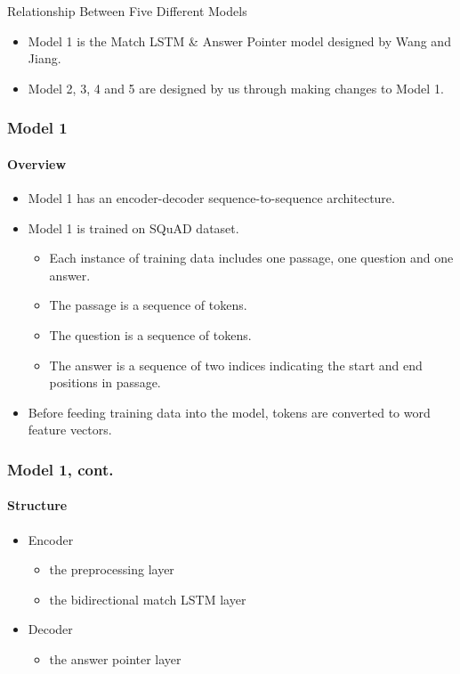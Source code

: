 \documentclass{beamer}
\begin{document}
\begin{frame}{Relationship Between Five Different Models}
    \begin{itemize}
        \item Model 1 is the Match LSTM \& Answer Pointer model designed by Wang and Jiang.
        \item Model 2, 3, 4 and 5 are designed by us through making changes to Model 1.
    \end{itemize}
\end{frame}

\begin{frame} \frametitle{Model 1}\framesubtitle{Overview}
  \begin{itemize}
      \item Model 1 has an encoder-decoder sequence-to-sequence architecture.
      \item Model 1 is trained on SQuAD dataset.
            \begin{itemize}
                \item Each instance of training data includes one passage, one question and one answer.
                \item The passage is a sequence of tokens.
                \item The question is a sequence of tokens.
                \item The answer is a sequence of two indices indicating the start and end positions in passage.
            \end{itemize}
      \item Before feeding training data into the model, tokens are converted to word feature vectors.
  \end{itemize}
\end{frame}

\begin{frame} \frametitle{Model 1, cont.}\framesubtitle{Structure}
    \begin{itemize}
        \item Encoder
            \begin{itemize}
                \item the preprocessing layer
                \item the bidirectional match LSTM layer
            \end{itemize}
        \item Decoder
            \begin{itemize}
                \item the answer pointer layer
            \end{itemize}
    \end{itemize}

\end{frame}
\end{document}
